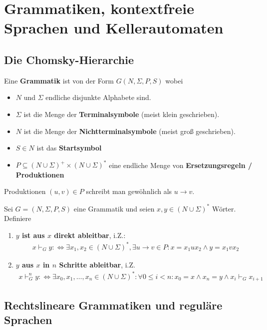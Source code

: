 
\chapter{Grammatiken, kontextfreie Sprachen und Kellerautomaten}

\section{Die Chomsky-Hierarchie}

\begin{definition}\label{def6.2}
	Eine \textbf{Grammatik} ist von der Form $G(N,\Sigma,P,S)$ wobei
	\begin{itemize}
		\item $N$ und $\Sigma$ endliche disjunkte Alphabete sind.
		\item $\Sigma$ ist die Menge der \textbf{Terminalsymbole} (meist klein geschrieben).
		\item $N$ ist die Menge der \textbf{Nichtterminalsymbole} (meist groß geschrieben).
		\item $S\in N$ ist das \textbf{Startsymbol}
		\item $P\subseteq(N\cup\Sigma)^+\times(N\cup\Sigma)^\ast$ eine endliche Menge von \textbf{Ersetzungsregeln / Produktionen}
	\end{itemize}
	Produktionen $(u,v)\in P$ schreibt man gewöhnlich als $u\to v$.
\end{definition}

\begin{definition}\label{def6.4}
	Sei $G=(N,\Sigma,P,S)$ eine Grammatik und seien $x,y\in(N\cup\Sigma)^\ast$ Wörter. Definiere
	\begin{enumerate}[label=\arabic*)]
		\item \textbf{$y$ ist aus $x$ direkt ableitbar}, i.Z.:
		\begin{align*}
			x\vdash_G y:\Longleftrightarrow\exists x_1,x_2\in (N\cup\Sigma)^\ast,\exists u\to v\in P: x=x_1 ux_2\wedge y=x_1 vx_2
		\end{align*}
		\item \textbf{$y$ aus $x$ in $n$ Schritte ableitbar}, i.Z.
		\begin{align*}
			x\vdash_G^n y:\Longleftrightarrow\exists x_0,x_1,\ldots,x_n\in (N\cup\Sigma)^\ast:\forall 0\leq i<n:x_0=x\wedge x_n=y\wedge x_i\vdash_G x_{i+1}
		\end{align*}
	\end{enumerate}
\end{definition}

\section{Rechtslineare Grammatiken und reguläre Sprachen}